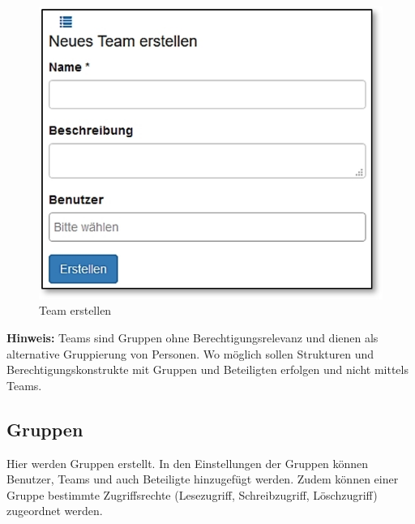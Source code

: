 \begin{figure}   %
  \vspace{-70pt}      %
  \begin{center}
    \includegraphics[width=1\linewidth]{../chapters/14_Benutzerverwaltung/pictures/14-2_TeamsBearbeiten_m.jpg}
  \end{center}
  \vspace{-20pt}
  \caption{Team erstellen}
  \vspace{-10pt}
\end{figure}

\textbf{Hinweis:} Teams sind Gruppen ohne Berechtigungsrelevanz und dienen als alternative Gruppierung von Personen. Wo möglich sollen Strukturen und Berechtigungskonstrukte mit Gruppen und Beteiligten erfolgen und nicht mittels Teams.

\vspace{1cm}

\subsection{Gruppen}

Hier werden Gruppen erstellt. In den Einstellungen der Gruppen können Benutzer, Teams und auch Beteiligte hinzugefügt werden. Zudem können einer Gruppe bestimmte Zugriffsrechte (Lesezugriff, Schreibzugriff, Löschzugriff) zugeordnet werden.

